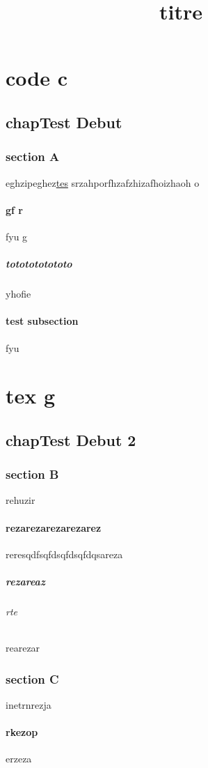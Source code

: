 \documentclass{report}
\title{titre}
\begin{document}
\maketitle
\tableofcontents
\part{code c}
\chapter{chapTest Debut}
\section{section A}{eghzipeghez\underline{\color{red}tes}
srzahporfhzafzhizafhoizhaoh o\subsection{gf r}{fyu g\subsubsection{tototototototo}{yhofie}
} \subsection{test subsection}{fyu}}
\part{tex g}
\chapter{chapTest Debut 2}
\section{section B}{rehuzir\subsection{rezarezarezarezarez}{reresqdfsqfds\color{red}qfdsqfdqsareza\subsubsection{rezareaz}{\paragraph{rte}{rearezar}}}}

\section{section C}{inetrnrezja\subsection{rkezop}{erzeza}}
\end{document}
